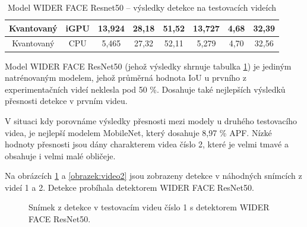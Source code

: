 \begin{table}[H]
\begin{tabular}{cc|ccc|ccc|}
  \multicolumn{1}{|c|}{\cellcolor[HTML]{E0DBDB}Kvantovaný}     & \cellcolor[HTML]{E0DBDB}iGPU & \multicolumn{1}{c|}{13,924}                                 & \multicolumn{1}{c|}{28,18}                                  & 51,52          & \multicolumn{1}{c|}{13,727}                                 & \multicolumn{1}{c|}{4,68}                                   & 32,39          \\ \hline
  \multicolumn{1}{|c|}{\cellcolor[HTML]{E0DBDB}Kvantovaný}     & \cellcolor[HTML]{E0DBDB}CPU  & \multicolumn{1}{c|}{5,465}                                  & \multicolumn{1}{c|}{27,32}                                  & 52,11          & \multicolumn{1}{c|}{5,279}                                  & \multicolumn{1}{c|}{4,70}                                   & 32,56          \\ \hline
  \end{tabular}
  \label{tabulka:wfrvidea}
  \caption{Model WIDER FACE Resnet50 -- výsledky detekce na testovacích videích}
\end{table}

Model WIDER FACE ResNet50 (jehož výsledky shrnuje tabulka \ref{tabulka:wfrvidea}) je jediným natrénovaným modelem, jehož průměrná hodnota IoU u prvního z experimentačních videí neklesla pod 50 \%. Dosahuje také nejlepších výsledků přesnosti detekce v prvním videu. 

V situaci kdy porovnáme výsledky přesnosti mezi modely u druhého testovacího videa, je nejlepší modelem MobileNet, který dosahuje 8,97 \% APF. Nízké hodnoty přesnosti jsou dány charakterem videa číslo 2, které je velmi tmavé a obsahuje i velmi malé obličeje.

Na obrázcích \ref{obrazek:video1} a \ref{obrazek:video2} jsou zobrazeny detekce v náhodných snímcích z videí 1 a 2. Detekce probíhala detektorem WIDER FACE ResNet50.

\begin{figure}[H] 
  \begin{center}
  \label{obrazek:video1}
  \caption{Snímek z detekce v testovacím videu číslo 1 s detektorem WIDER FACE ResNet50.}
  \end{center}
\end{figure}

